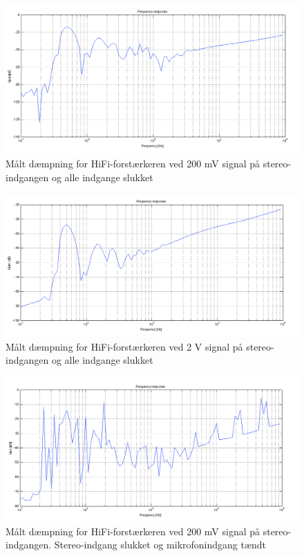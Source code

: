 \begin{figure}[h]
\centering
\includegraphics[width=\textwidth]{maalerapporter/final/daempning/final_daempning_stereo_200mv_alloff.png}
\caption{Målt dæmpning for HiFi-forstærkeren ved 200 mV signal på stereo-indgangen og alle indgange slukket}
\label{maalerapport_final13}
\end{figure}

\begin{figure}[h]
\centering
\includegraphics[width=\textwidth]{maalerapporter/final/daempning/final_daempning_stereo_2v_alloff.png}
\caption{Målt dæmpning for HiFi-forstærkeren ved 2 V signal på stereo-indgangen og alle indgange slukket}
\label{maalerapport_final14}
\end{figure}

\begin{figure}[h]
\centering
\includegraphics[width=\textwidth]{maalerapporter/final/daempning/final_daempning_stereo_200mv_micon.png}
\caption{Målt dæmpning for HiFi-forstærkeren ved 200 mV signal på stereo-indgangen. Stereo-indgang slukket og mikrofonindgang tændt}
\label{maalerapport_final15}
\end{figure}

